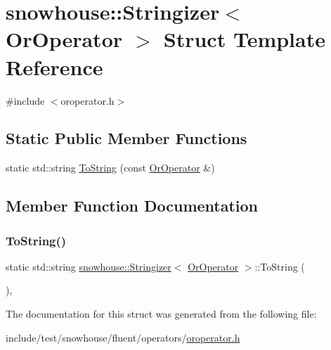 \hypertarget{structsnowhouse_1_1Stringizer_3_01OrOperator_01_4}{}\section{snowhouse\+::Stringizer$<$ Or\+Operator $>$ Struct Template Reference}
\label{structsnowhouse_1_1Stringizer_3_01OrOperator_01_4}


{\ttfamily \#include $<$oroperator.\+h$>$}

\subsection*{Static Public Member Functions}
\begin{DoxyCompactItemize}
\item 
static std\+::string \mbox{\hyperlink{structsnowhouse_1_1Stringizer_3_01OrOperator_01_4_af7e385d1e798efa1c6054d31fb123171}{To\+String}} (const \mbox{\hyperlink{structsnowhouse_1_1OrOperator}{Or\+Operator}} \&)
\end{DoxyCompactItemize}


\subsection{Member Function Documentation}
\mbox{\label{structsnowhouse_1_1Stringizer_3_01OrOperator_01_4_af7e385d1e798efa1c6054d31fb123171}} 
\subsubsection{\texorpdfstring{ToString()}{ToString()}}
{\footnotesize\ttfamily static std\+::string \mbox{\hyperlink{structsnowhouse_1_1Stringizer}{snowhouse\+::\+Stringizer}}$<$ \mbox{\hyperlink{structsnowhouse_1_1OrOperator}{Or\+Operator}} $>$\+::To\+String (\begin{DoxyParamCaption}\item[{const \mbox{\hyperlink{structsnowhouse_1_1OrOperator}{Or\+Operator}} \&}]{ }\end{DoxyParamCaption})\hspace{0.3cm}{\ttfamily [inline]}, {\ttfamily [static]}}



The documentation for this struct was generated from the following file\+:\begin{DoxyCompactItemize}
\item 
include/test/snowhouse/fluent/operators/\mbox{\hyperlink{oroperator_8h}{oroperator.\+h}}\end{DoxyCompactItemize}
